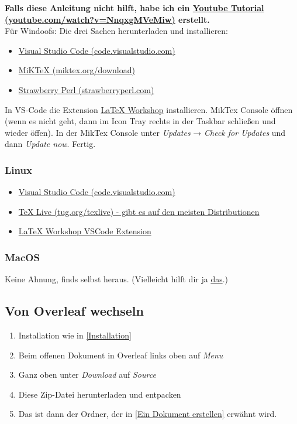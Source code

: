 \documentclass{article}
\begin{document}
\textbf{Falls diese Anleitung nicht hilft, habe ich ein \href{https://www.youtube.com/watch?v=NnqxgMVeMiw}{Youtube Tutorial (youtube.com/watch?v=NnqxgMVeMiw)} erstellt.}\\

Für Windoofs: Die drei Sachen herunterladen und installieren: 
\begin{itemize}
    \item \href{https://code.visualstudio.com/}{Visual Studio Code (code.visualstudio.com)}
    \item \href{https://miktex.org/download}{MiKTeX (miktex.org/download)}
    \item \href{https://strawberryperl.com/}{Strawberry Perl (strawberryperl.com)}
\end{itemize}
In VS-Code die Extension \href{https://open-vsx.org/extension/James-Yu/latex-workshop}{LaTeX Workshop} installieren. MikTex Console öffnen (wenn es nicht geht, dann im Icon Tray rechts in der Taskbar schließen und wieder öffen).
In der MikTex Console unter \textit{Updates} → \textit{Check for Updates} und dann \textit{Update now}. Fertig. 
\subsubsection{Linux}
\begin{itemize}
    \item \href{https://code.visualstudio.com/}{Visual Studio Code (code.visualstudio.com)}
    \item \href{https://tug.org/texlive}{TeX Live (tug.org/texlive) - gibt es auf den meisten Distributionen}
    \item \href{https://open-vsx.org/extension/James-Yu/latex-workshop}{LaTeX Workshop VSCode Extension}
\end{itemize}

\subsubsection{MacOS}
Keine Ahnung, finds selbst heraus.
(Vielleicht hilft dir ja \href{https://tex.stackexchange.com/questions/220/i-want-to-start-using-latex-on-mac-os-x-where-do-i-start}{das}.)

\subsection{Von Overleaf wechseln}

\begin{enumerate}
    \item Installation wie in \autoref{Installation}
    \item Beim offenen Dokument in Overleaf links oben auf \textit{Menu}
    \item Ganz oben unter \textit{Download} auf \textit{Source}
    \item Diese Zip-Datei herunterladen und entpacken 
    \item Das ist dann der Ordner, der in \autoref{Ein Dokument erstellen} erwähnt wird.
\end{enumerate}
\end{document}
